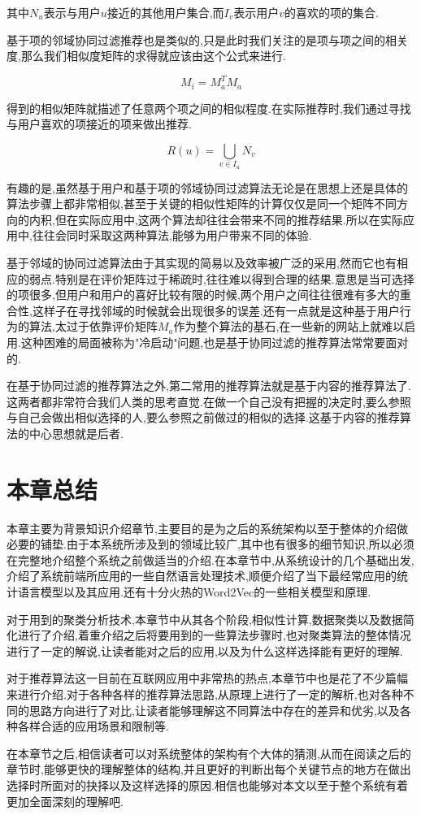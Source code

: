 其中$N_u$表示与用户$u$接近的其他用户集合,而$I_v$表示用户$v$的喜欢的项的集合.

基于项的邻域协同过滤推荐也是类似的,只是此时我们关注的是项与项之间的相关度,那么我们相似度矩阵的求得就应该由这个公式来进行.

\begin{equation}
	M_i = M_a^T M_a
\end{equation}

得到的相似矩阵就描述了任意两个项之间的相似程度.在实际推荐时,我们通过寻找与用户喜欢的项接近的项来做出推荐.

\begin{equation}
		R(u) = \bigcup_{v \in I_u} N_v
\end{equation}

有趣的是,虽然基于用户和基于项的邻域协同过滤算法无论是在思想上还是具体的算法步骤上都非常相似,甚至于关键的相似性矩阵的计算仅仅是同一个矩阵不同方向的内积,但在实际应用中,这两个算法却往往会带来不同的推荐结果.所以在实际应用中,往往会同时采取这两种算法,能够为用户带来不同的体验.

基于邻域的协同过滤算法由于其实现的简易以及效率被广泛的采用,然而它也有相应的弱点.特别是在评价矩阵过于稀疏时,往往难以得到合理的结果.意思是当可选择的项很多,但用户和用户的喜好比较有限的时候,两个用户之间往往很难有多大的重合性,这样子在寻找邻域的时候就会出现很多的误差.还有一点就是这种基于用户行为的算法,太过于依靠评价矩阵$M_a$作为整个算法的基石,在一些新的网站上就难以启用.这种困难的局面被称为"冷启动"问题,也是基于协同过滤的推荐算法常常要面对的.

在基于协同过滤的推荐算法之外,第二常用的推荐算法就是基于内容的推荐算法了.这两者都非常符合我们人类的思考直觉.在做一个自己没有把握的决定时,要么参照与自己会做出相似选择的人,要么参照之前做过的相似的选择.这基于内容的推荐算法的中心思想就是后者.

\section{本章总结}
\label{sec:sum2}

本章主要为背景知识介绍章节,主要目的是为之后的系统架构以至于整体的介绍做必要的铺垫.由于本系统所涉及到的领域比较广,其中也有很多的细节知识,所以必须在完整地介绍整个系统之前做适当的介绍.在本章节中,从系统设计的几个基础出发,介绍了系统前端所应用的一些自然语言处理技术,顺便介绍了当下最经常应用的统计语言模型以及其应用.还有十分火热的Word2Vec的一些相关模型和原理.

对于用到的聚类分析技术,本章节中从其各个阶段,相似性计算,数据聚类以及数据简化进行了介绍,着重介绍之后将要用到的一些算法步骤时,也对聚类算法的整体情况进行了一定的解说,让读者能对之后的应用,以及为什么这样选择能有更好的理解.

对于推荐算法这一目前在互联网应用中非常热的热点,本章节中也是花了不少篇幅来进行介绍.对于各种各样的推荐算法思路,从原理上进行了一定的解析,也对各种不同的思路方向进行了对比,让读者能够理解这不同算法中存在的差异和优劣,以及各种各样合适的应用场景和限制等.

在本章节之后,相信读者可以对系统整体的架构有个大体的猜测,从而在阅读之后的章节时,能够更快的理解整体的结构,并且更好的判断出每个关键节点的地方在做出选择时所面对的抉择以及这样选择的原因.相信也能够对本文以至于整个系统有着更加全面深刻的理解吧.






